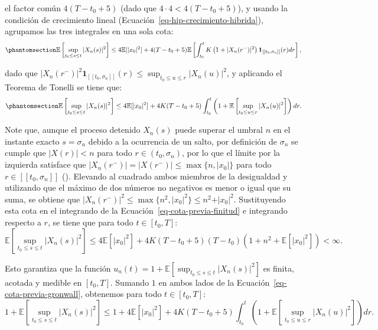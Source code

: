 \documentclass[
  spanish,
  us-letterpaper,
]{scrreprt}
\numberwithin{equation}{section}
\theoremstyle{plain}
\theoremstyle{plain}
\theoremstyle{definition}
\theoremstyle{plain}
\theoremstyle{remark}
\begin{document}
el factor común \(4(T - t_0 + 5)\) (dado que
\(4 \cdot 4 < 4(T - t_0 + 5)\)), y usando la condición de crecimiento
lineal (Ecuación~\ref{eq-hip-crecimiento-hibrida}), agrupamos las tres
integrales en una sola cota:
\begin{equation}\phantomsection\label{eq-cota-previa-finitud}{
\mathbb{E}\left[ \sup_{t_0 \le s \le t} \vert X_n(s) \vert^2 \right] \le 4\mathbb{E}[\vert x_0 \vert^2] + 4(T - t_0 + 5)\mathbb{E}\left[ \int_{t_0}^t K\left( 1 + \vert X_n(r^-) \vert^2 \right) \mathbf{1}_{[[t_0, \sigma_n]]}(r) dr \right],
}\end{equation}

dado que
\(\displaystyle \vert X_n(r^-) \vert^2 \mathbf{1}_{[[t_0, \sigma_n]]}(r) \le \sup_{t_0 \le u \le r} \vert X_n(u) \vert^2\),
y aplicando el Teorema de Tonelli se tiene que:
\begin{equation}\phantomsection\label{eq-cota-previa-gronwall}{
\mathbb{E}\left[ \sup_{t_0 \le s \le t} \vert X_n(s) \vert^2 \right] \le 4\mathbb{E}[\vert x_0 \vert^2] + 4K(T - t_0 + 5) \int_{t_0}^t \left( 1 + \mathbb{E}\left[ \sup_{t_0 \le u \le r} \vert X_n(u) \vert^2 \right] \right) dr.
}\end{equation}

Note que, aunque el proceso detenido \(X_n(s)\) puede superar el umbral
\(n\) en el instante exacto \(s = \sigma_n\) debido a la ocurrencia de
un salto, por definición de \(\sigma_n\) se cumple que
\(\vert X(r) \vert < n\) para todo \(r \in (t_0, \sigma_n)\), por lo que
el límite por la izquierda satisface que
\(\vert X_n(r^-) \vert = \vert X(r^-) \vert \le \max\{n, \vert x_0 \vert\}\)
para todo \(r \in [[t_0, \sigma_n]]\)
(). Elevando al cuadrado ambos
miembros de la desigualdad y utilizando que el máximo de dos números no
negativos es menor o igual que su suma, se obtiene que
\(\vert X_n(r^-) \vert^2 \le \max\{n^2, \vert x_0 \vert^2\} \le n^2 + \vert x_0 \vert^2\).
Sustituyendo esta cota en el integrando de la
Ecuación~\ref{eq-cota-previa-finitud} e integrando respecto a \(r\), se
tiene que para todo \(t \in [t_0, T]\): \[
\mathbb{E}\left[ \sup_{t_0 \le s \le t} \vert X_n(s) \vert^2 \right] \le 4\mathbb{E}[\vert x_0 \vert^2] + 4K(T - t_0 + 5)(T - t_0)\left( 1 + n^2 + \mathbb{E}[\vert x_0 \vert^2] \right) < \infty.
\]

Esto garantiza que la función
\(\displaystyle u_n(t) = 1 + \mathbb{E}\left[ \sup_{t_0 \le s \le t} \vert X_n(s) \vert^2 \right]\)
es finita, acotada y medible en \([t_0, T].\) Sumando \(1\) en ambos
lados de la Ecuación~\ref{eq-cota-previa-gronwall}, obtenemos para todo
\(t \in [t_0, T]\): \[
1 + \mathbb{E}\left[ \sup_{t_0 \le s \le t} \vert X_n(s) \vert^2 \right] \le 1 + 4\mathbb{E}[\vert x_0 \vert^2] + 4K(T - t_0 + 5) \int_{t_0}^t \left( 1 + \mathbb{E}\left[ \sup_{t_0 \le u \le r} \vert X_n(u) \vert^2 \right] \right) dr.
\]
\end{document}
